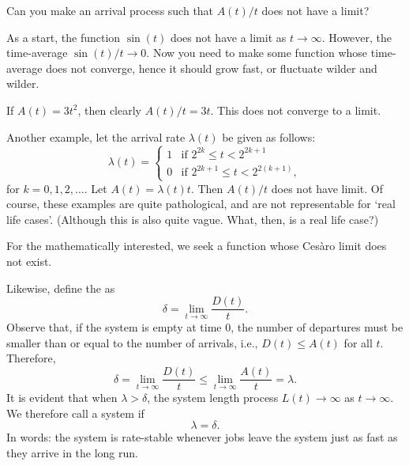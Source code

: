 \begin{extra}
  Can you make an arrival process such that $A(t)/t$ does not have a limit?
\begin{hint}
  As a start, the function $\sin(t)$ does not have a limit as $t\to\infty$.
  However, the time-average $\sin(t)/t \to 0$.
  Now you need to make some function whose time-average does not converge, hence it should grow fast, or fluctuate wilder and wilder.
\end{hint}
\begin{solution}
 If $A(t) = 3 t^2$, then clearly $A(t)/t = 3t$. This does not
 converge to a limit. 

 Another example, let the arrival rate $\lambda(t)$ be given as follows:
 \begin{equation*}
 \lambda(t) = 
 \begin{cases}
 1 & \text{if } 2^{2k} \leq t < 2^{2k+1} \\
 0 & \text{if } 2^{2k+1} \leq t < 2^{2(k+1)},
 \end{cases}
 \end{equation*}
 for $k=0,1,2,\ldots$.
 Let $A(t) = \lambda(t) t$.
 Then $A(t)/t$ does not have limit.
 Of course, these examples are quite pathological, and are not representable for `real life cases'.
 (Although this is also quite vague.
 What, then, is a real life case?)

 For the mathematically interested, we seek a function whose Ces\`aro limit does not exist.
\end{solution}
\end{extra}

Likewise, define the  as
\begin{equation}\label{eq:28}
 \delta = \lim_{t\to\infty} \frac{D(t)}t.
\end{equation}
Observe that, if the system is empty at time $0$, the number of departures must be smaller than or equal to the number of arrivals, i.e., $D(t) \leq A(t)$ for all $t$.
Therefore,
\begin{equation}\label{eq:26}
\delta = \lim_{t\to\infty} \frac{D(t)}t \leq \lim_{t\to\infty} \frac{A(t)}t = \lambda.
\end{equation}
It is evident that when $\lambda > \delta$, the system length process $L(t) \to \infty$ as $t\to \infty$.
We therefore call a system  if
\begin{equation*}
 \lambda = \delta.
\end{equation*}
In  words: the system is rate-stable whenever jobs leave the system just as fast as they arrive in the long run.


